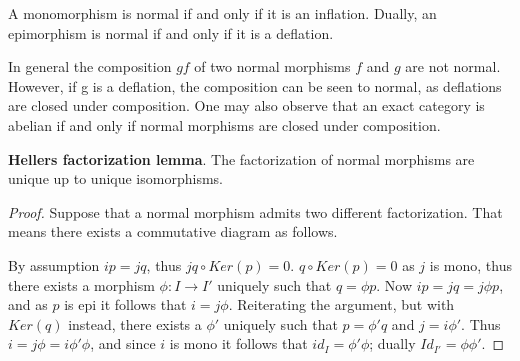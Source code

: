     \begin{remark}
        A monomorphism is normal if and only if it is an inflation. Dually, an epimorphism is normal if and only if it is a deflation.
    \end{remark}

    \begin{remark}
        In general the composition $gf$ of two normal morphisms $f$ and $g$ are not normal. However, if g is a deflation, the composition can be seen to normal, as deflations are closed under composition. One may also observe that an exact category is abelian if and only if normal morphisms are closed under composition.
    \end{remark}

    \begin{lemma}
        \textbf{Hellers factorization lemma}. The factorization of normal morphisms are unique up to unique isomorphisms.
    \end{lemma}

    \begin{proof}
        Suppose that a normal morphism admits two different factorization. That means there exists a commutative diagram as follows.
        \begin{center}
        \end{center}
        By assumption $ip=jq$, thus $jq\circ Ker(p)=0$. $q\circ Ker(p)=0$ as $j$ is mono, thus there exists a morphism $\phi:I\rightarrow I'$ uniquely such that $q=\phi p$. Now $ip=jq=j\phi p$, and as $p$ is epi it follows that $i=j\phi$. Reiterating the argument, but with $Ker(q)$ instead, there exists a $\phi '$ uniquely such that $p = \phi 'q$ and $j=i\phi '$. Thus $i=j\phi = i\phi '\phi$, and since $i$ is mono it follows that $id_I=\phi '\phi$; dually $Id_{I'}=\phi\phi '$.
    \end{proof}

